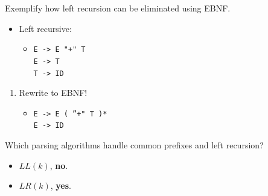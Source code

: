 \documentclass[11pt]{beamer}
\begin{document}
\begin{frame}

\begin{block}{Exemplify how left recursion can be eliminated using EBNF.}
\begin{itemize}
\item Left recursive:
\begin{itemize}
\item
\texttt{E -> E "+" T }\\
\texttt{E -> T}\\
\texttt{T -> ID}
\end{itemize}
\end{itemize}
\begin{enumerate}
\item Rewrite to EBNF!
\begin{itemize}
\item 
\texttt{E -> E ( ”+" T )*}\\
\texttt{E -> ID}\\

\end{itemize}
\end{enumerate}
\end{block}

\begin{block}{Which parsing algorithms handle common prefixes and left recursion? }
\begin{itemize}
\item $LL(k)$, \textbf{no}.
\item $LR(k)$, \textbf{yes}.
\end{itemize}
\end{block}

\end{frame}
\end{document}
